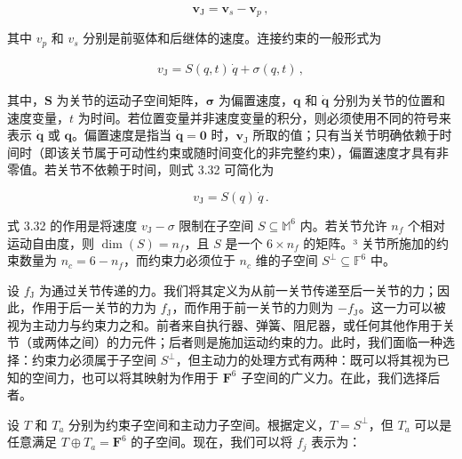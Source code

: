 \documentclass[10pt,a4paper]{book}
\theoremstyle{thmstyle} %
\theoremstyle{defstyle} %
\theoremstyle{prostyle} %
\begin{document}
$$
{ \boldsymbol { v } } _ { \mathrm { J } } = { \boldsymbol { v } } _ { s } - { \boldsymbol { v } } _ { p } \, ,
$$



其中 $v_{p}$ 和 $v_{s}$ 分别是前驱体和后继体的速度。连接约束的一般形式为



$$
\begin{array}{r} { v _ { \mathrm { J } } = S ( q , t ) \, \dot { q } + \sigma ( q , t ) \, , } \end{array}
$$



其中，$\boldsymbol{S}$ 为关节的运动子空间矩阵，$\boldsymbol{\sigma}$ 为偏置速度，$\boldsymbol{q}$ 和 $\dot{\boldsymbol{q}}$ 分别为关节的位置和速度变量，$t$ 为时间。若位置变量并非速度变量的积分，则必须使用不同的符号来表示 $\dot{\boldsymbol{q}}$ 或 $\boldsymbol{q}$。偏置速度是指当 $\dot{\boldsymbol{q}} = \mathbf{0}$ 时，$\boldsymbol{v}_{\mathrm{J}}$ 所取的值；只有当关节明确依赖于时间时（即该关节属于可动性约束或随时间变化的非完整约束），偏置速度才具有非零值。若关节不依赖于时间，则式 3.32 可简化为



$$
v _ { \mathrm { J } } = S ( q ) \, \dot { q } \, .
$$



式 3.32 的作用是将速度 $v_{\mathrm{J}} - \sigma$ 限制在子空间 $S \subseteq \mathbb{M}^{6}$ 内。若关节允许 $n_{f}$ 个相对运动自由度，则 $\operatorname{dim}(S) = n_{f}$，且 $S$ 是一个 $6 \times n_{f}$ 的矩阵。³ 关节所施加的约束数量为 $n_{c} = 6 - n_{f}$，而约束力必须位于 $n_{c}$ 维的子空间 $S^{\perp} \subseteq \mathbb{F}^{6}$ 中。



设 $f_{\mathrm{J}}$ 为通过关节传递的力。我们将其定义为从前一关节传递至后一关节的力；因此，作用于后一关节的力为 $f_{\mathrm{J}}$，而作用于前一关节的力则为 $-f_{\mathrm{J}}$。这一力可以被视为主动力与约束力之和。前者来自执行器、弹簧、阻尼器，或任何其他作用于关节（或两体之间）的力元件；后者则是施加运动约束的力。此时，我们面临一种选择：约束力必须属于子空间 $S^{\perp}$，但主动力的处理方式有两种：既可以将其视为已知的空间力，也可以将其映射为作用于 $\mathbf{F}^{6}$ 子空间的广义力。在此，我们选择后者。



设 $T$ 和 $T_a$ 分别为约束子空间和主动力子空间。根据定义，$T = S^{\perp}$，但 $T_a$ 可以是任意满足 $T \oplus T_a = \mathbf{F}^6$ 的子空间。现在，我们可以将 $f_j$ 表示为：
\end{document}
